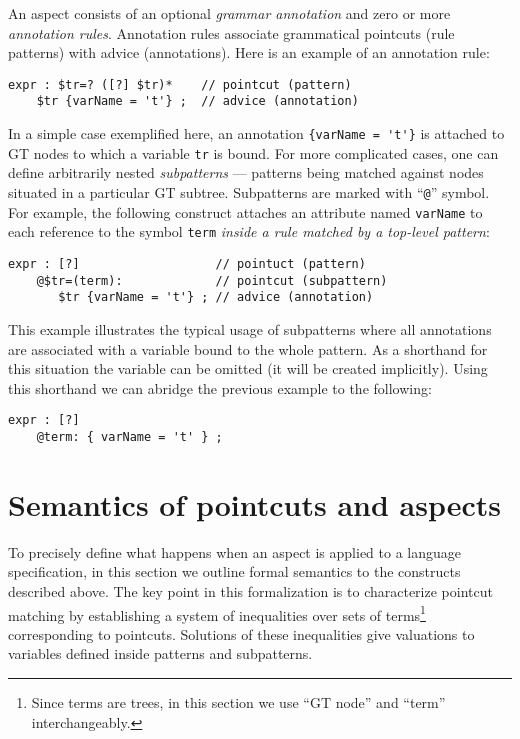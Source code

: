 \documentclass{IOS-Book-Article}     %
\begin{document}
An aspect consists of an optional \emph{grammar annotation} and zero or more \emph{annotation rules}. Annotation rules associate grammatical pointcuts (rule patterns) with advice (annotations). Here is an example of an annotation rule:
\begin{lstlisting}[language=Grammatic]
expr : $tr=? ([?] $tr)*    // pointcut (pattern)
    $tr {varName = 't'} ;  // advice (annotation)
\end{lstlisting}%
In a simple case exemplified here, an annotation \lstinline!{varName = 't'}! is attached to GT nodes to which a variable \texttt{tr} is bound.
For more complicated cases, one can define arbitrarily nested \emph{subpatterns} --- patterns being matched against nodes situated in a particular GT subtree. Subpatterns are marked with ``\lstinline!@!'' symbol. For example, the following construct attaches an attribute named \texttt{varName} to each reference to the symbol \texttt{term} \emph{inside a rule matched by a top-level pattern}:
\begin{lstlisting}[language=Grammatic]
expr : [?]                   // pointuct (pattern) 
    @$tr=(term):             // pointcut (subpattern)
       $tr {varName = 't'} ; // advice (annotation)
\end{lstlisting}
This example illustrates the typical usage of subpatterns where all annotations are associated with a variable bound to the whole pattern. As a shorthand for this situation the variable can be omitted (it will be created implicitly). Using this shorthand we can abridge the previous example to the following:
\begin{lstlisting}[language=Grammatic]
expr : [?]
    @term: { varName = 't' } ; 
\end{lstlisting}
%

\section{Semantics of pointcuts and aspects}

To precisely define what happens when an aspect is applied to a language specification, in this section we outline formal semantics to the constructs described above. The key point in this formalization is to characterize pointcut matching by establishing a system of inequalities over sets of terms\footnote{Since terms are trees, in this section we use ``GT node'' and ``term'' interchangeably.} corresponding to pointcuts. Solutions of these inequalities give valuations to variables defined inside patterns and subpatterns.
\end{document}
